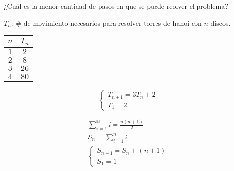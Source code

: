 \documentclass[../main.tex]{subfiles}
\begin{document}
¿Cuál es la menor cantidad de pasos en que se puede reolver el problema?

\teorema
$T_n$: \# de movimiento necesarios para resolver torres de hanoi con $n$ discos.

\begin{center}
	\begin{tabular}{c|c}
		$n$ & $T_n$\\
		\hline
		$1$ & $2$ \\
		$2$ & $8$ \\
		$3$ & $26$ \\
		$4$ & $80$
	\end{tabular}
\end{center}

\[
	\begin{cases}
		T_{n+1}=3T_n+2\\
		T_1=2
	\end{cases}
\]

\begin{gather*}
	\sum^\mathbb{N}_{i=1}i
	= \frac{n(n+1)}{2} \\
	S_n =
	\sum^n_{i=1}i\\
	\begin{cases}
		S_{n+1} = S_n+(n+1)\\
		S_1 = 1
	\end{cases}
\end{gather*}
\end{document}

